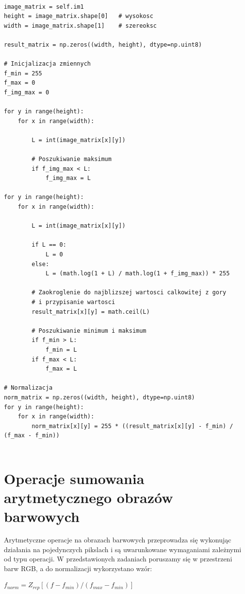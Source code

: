 \documentclass[final,a4paper,openany,12pt]{mwbk}
\begin{document}
\begin{lstlisting}[caption=Logarytmowanie obrazu szarego]

image_matrix = self.im1
height = image_matrix.shape[0]   # wysokosc
width = image_matrix.shape[1]    # szereoksc

result_matrix = np.zeros((width, height), dtype=np.uint8)

# Inicjalizacja zmiennych
f_min = 255
f_max = 0
f_img_max = 0

for y in range(height):
    for x in range(width):  

        L = int(image_matrix[x][y]) 

        # Poszukiwanie maksimum
        if f_img_max < L:
            f_img_max = L

for y in range(height):
    for x in range(width):  

        L = int(image_matrix[x][y]) 

        if L == 0:
            L = 0
        else:
            L = (math.log(1 + L) / math.log(1 + f_img_max)) * 255

        # Zaokroglenie do najblizszej wartosci calkowitej z gory
        # i przypisanie wartosci
        result_matrix[x][y] = math.ceil(L)

        # Poszukiwanie minimum i maksimum
        if f_min > L:
            f_min = L
        if f_max < L:
            f_max = L

# Normalizacja
norm_matrix = np.zeros((width, height), dtype=np.uint8)
for y in range(height):
    for x in range(width):
        norm_matrix[x][y] = 255 * ((result_matrix[x][y] - f_min) / (f_max - f_min))


\end{lstlisting}


\chapter{Operacje sumowania arytmetycznego obrazów barwowych}

Arytmetyczne operacje na obrazach barwowych przeprowadza się wykonując działania na pojedynczych pikslach i są uwarunkowane wymaganiami zależnymi od typu operacji. 
W przedstawionych zadaniach poruszamy się w przestrzeni barw RGB, a do normalizacji wykorzystano wzór:

	\begin{center}
		$ f_{norm} = Z_{rep}[(f - f_{min}) / (f_{max} - f_{min})] $
	\end{center}
\end{document}

